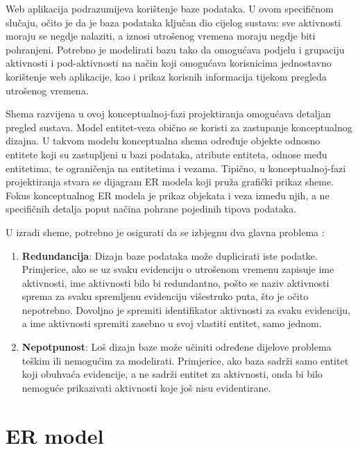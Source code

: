 \documentclass[times, utf8, zavrsni]{fer}
\begin{document}
Web aplikacija podrazumijeva korištenje baze podataka. U ovom specifičnom slučaju, očito je da je baza podataka ključan dio cijelog sustava: sve aktivnosti moraju se negdje nalaziti, a iznosi utrošenog vremena moraju negdje biti pohranjeni. Potrebno je modelirati bazu tako da omogućava podjelu i grupaciju aktivnosti i pod-aktivnosti na način koji omogućava korisnicima jednostavno korištenje web aplikacije, kao i prikaz korisnih informacija tijekom pregleda utrošenog vremena.

Shema razvijena u ovoj konceptualnoj-fazi projektiranja omogućava detaljan pregled sustava. Model entitet-veza  obično se koristi za zastupanje konceptualnog dizajna. U takvom modelu konceptualna shema određuje objekte odnosno entitete koji su zastupljeni u bazi podataka, atribute entiteta, odnose među entitetima, te ograničenja na entitetima i vezama. Tipično, u konceptualnoj-fazi projektiranja stvara se dijagram ER modela koji pruža grafički prikaz sheme. Fokus konceptualnog ER modela je prikaz objekata i veza između njih, a ne specifičnih detalja poput načina pohrane pojedinih tipova podataka.

U izradi sheme, potrebno je osigurati da se izbjegnu dva glavna problema \citep{dbsyscon}:
\begin{enumerate}[leftmargin=*]
\item \textbf{Redundancija}: Dizajn baze podataka može duplicirati iste podatke. Primjerice, ako se uz svaku evidenciju o utrošenom vremenu zapisuje ime aktivnosti, ime aktivnosti bilo bi redundantno, pošto se naziv aktivnosti sprema za svaku spremljenu evidenciju višestruko puta, što je očito nepotrebno. Dovoljno je spremiti identifikator aktivnosti za svaku evidenciju, a ime aktivnosti spremiti zasebno u svoj vlastiti entitet, samo jednom.
\item \textbf{Nepotpunost}: Loš dizajn baze može učiniti određene dijelove problema teškim ili nemogućim za modelirati. Primjerice, ako baza sadrži samo entitet koji obuhvaća evidencije, a ne sadrži entitet za aktivnosti, onda bi bilo nemoguće prikazivati aktivnosti koje još nisu evidentirane.
\end{enumerate}

\section{ER model}
\end{document}
